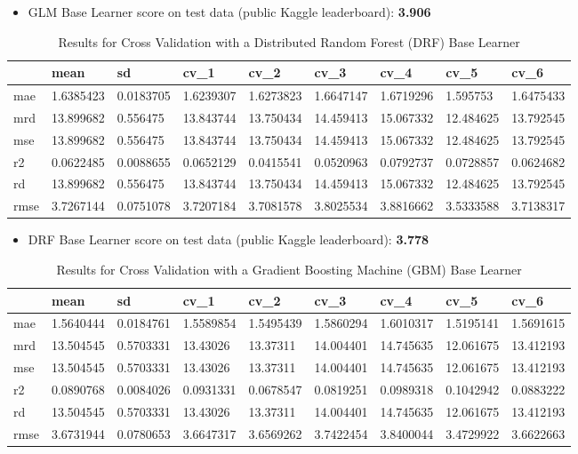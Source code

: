 \documentclass{article}
\begin{document}
\begin{itemize}
    \item GLM Base Learner score on test data (public Kaggle leaderboard): \textbf{3.906}
\end{itemize}

\begin{table}[h]
 \caption{Results for Cross Validation with a Distributed Random Forest (DRF) Base Learner}
  \centering
  \begin{tabular}{lllllllll}
    \toprule
     &          mean & sd & cv\_1 & cv\_2 & cv\_3 & cv\_4 & cv\_5 & cv\_6\\
    \midrule
    mae&        1.6385423&0.0183705&1.6239307&1.6273823&1.6647147&1.6719296&1.595753&1.6475433\\
    mrd&        13.899682&0.556475&13.843744&13.750434&14.459413&15.067332&12.484625&13.792545\\
    mse&        13.899682&0.556475&13.843744&13.750434&14.459413&15.067332&12.484625&13.792545\\
    r2&         0.0622485&0.0088655&0.0652129&0.0415541&0.0520963&0.0792737&0.0728857&0.0624682\\
    rd&         13.899682&0.556475&13.843744&13.750434&14.459413&15.067332&12.484625&13.792545\\
    rmse&       3.7267144&0.0751078&3.7207184&3.7081578&3.8025534&3.8816662&3.5333588&3.7138317\\
    \bottomrule
  \end{tabular}
  \label{tab:drf_results}
\end{table}

\begin{itemize}
    \item DRF Base Learner score on test data (public Kaggle leaderboard): \textbf{3.778}
\end{itemize}

\begin{table}[h]
 \caption{Results for Cross Validation with a Gradient Boosting Machine (GBM) Base Learner}
  \centering
  \begin{tabular}{lllllllll}
    \toprule
     &          mean & sd & cv\_1 & cv\_2 & cv\_3 & cv\_4 & cv\_5 & cv\_6\\
    \midrule
    mae&        1.5640444&0.0184761&1.5589854&1.5495439&1.5860294&1.6010317&1.5195141&1.5691615\\
    mrd&        13.504545&0.5703331&13.43026&13.37311&14.004401&14.745635&12.061675&13.412193\\
    mse&        13.504545&0.5703331&13.43026&13.37311&14.004401&14.745635&12.061675&13.412193\\
    r2&         0.0890768&0.0084026&0.0931331&0.0678547&0.0819251&0.0989318&0.1042942&0.0883222\\
    rd&         13.504545&0.5703331&13.43026&13.37311&14.004401&14.745635&12.061675&13.412193\\
    rmse&       3.6731944&0.0780653&3.6647317&3.6569262&3.7422454&3.8400044&3.4729922&3.6622663\\
    \bottomrule
  \end{tabular}
  \label{tab:gbm_results}
\end{table}
\end{document}
